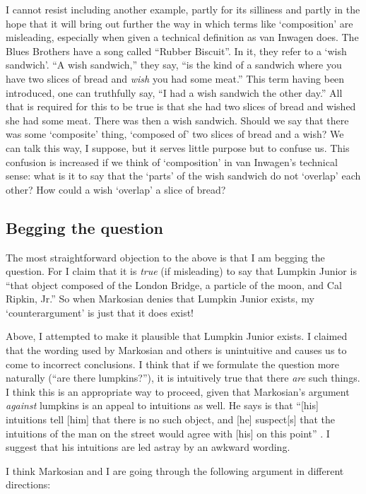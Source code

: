 \documentclass[11pt]{article}
\begin{document}
\begin{spacing}{1.25}
I cannot resist including another example, partly for its silliness
and partly in the hope that it will bring out further the way in which
terms like `composition' are misleading, especially when given a
technical definition as van Inwagen does.  The Blues Brothers have a
song called ``Rubber Biscuit''.  In it, they refer to a `wish
sandwich'.  ``A wish sandwich,'' they say, ``is the kind of a sandwich
where you have two slices of bread and {\em wish} you had some meat.''
This term having been introduced, one can truthfully say, ``I had a
wish sandwich the other day.''  All that is required for this to be
true is that she had two slices of bread and wished she had some meat.
There was then a wish sandwich.  Should we say that there was some
`composite' thing, `composed of' two slices of bread and a wish?  We
can talk this way, I suppose, but it serves little purpose but to
confuse us.  This confusion is increased if we think of `composition'
in van Inwagen's technical sense: what is it to say that the `parts'
of the wish sandwich do not `overlap' each other?  How could a wish
`overlap' a slice of bread?

\subsection{Begging the question}
\label{beg}
The most straightforward objection to the above is that I am begging
the question.  For I claim that it is {\em true} (if misleading) to
say that Lumpkin Junior is ``that object composed of the London
Bridge, a particle of the moon, and Cal Ripkin, Jr.''  So when
Markosian denies that Lumpkin Junior exists, my `counterargument' is
just that it does exist!

Above, I attempted to make it plausible that Lumpkin Junior exists.  I
claimed that the wording used by Markosian and others is unintuitive
and causes us to come to incorrect conclusions.  I think that if we
formulate the question more naturally (``are there lumpkins?''), it is
intuitively true that there {\em are} such things.  I think this is an
appropriate way to proceed, given that Markosian's argument {\em
  against} lumpkins is an appeal to intuitions as well.  He says is
that ``[his] intuitions tell [him] that there is no such object, and
[he] suspect[s] that the intuitions of the man on the street would
agree with [his] on this point'' \citeyearpar[228]{markosian1998a}.  I
suggest that his intuitions are led astray by an awkward wording.

I think Markosian and I are going through the following argument in
different directions:


\end{spacing}
\end{document}
